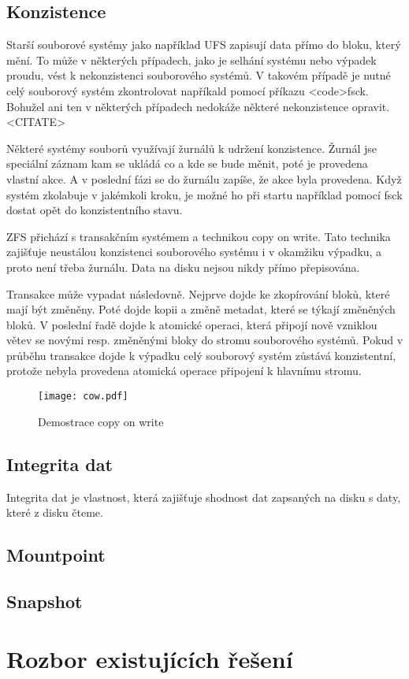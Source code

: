     \subsection{Konzistence}
    Starší souborové systémy jako například UFS zapisují data přímo do bloku, který mění. To může v některých případech, jako je selhání systému nebo výpadek proudu, vést k nekonzistenci souborového systémů. V takovém případě je nutné celý souborový systém zkontrolovat napříkald pomocí příkazu <code>fsck. Bohužel ani ten v některých případech
    nedokáže některé nekonzistence opravit. <CITATE>

    Některé systémy souborů využívají žurnálů k udržení konzistence. Žurnál jse speciální záznam kam se ukládá co a kde se bude měnit, poté
    je provedena vlastní akce. A v poslední fázi se do žurnálu zapíše, že akce byla provedena. Když systém zkolabuje v jakémkoli kroku, je možné ho při startu například pomocí
    fsck dostat opět do konzistentního stavu.

    ZFS přichází s transakčním systémem a technikou copy on write. Tato technika zajišťuje neustálou konzistenci souborového systému i v okamžiku výpadku, a proto není třeba žurnálu. Data na disku nejsou nikdy přímo přepisována.

    Transakce může vypadat následovně. Nejprve dojde ke zkopírování bloků, které mají být změněny. Poté dojde kopii a změně metadat, které se týkají změněných bloků. V poslední
    řadě dojde k atomické operaci, která připojí nově vzniklou větev se novými resp. změněnými bloky do stromu souborového systémů. Pokud v průběhu transakce dojde k výpadku
    celý souborový systém zůstává konzistentní, protože nebyla provedena atomická operace připojení k hlavnímu stromu.
    \begin{figure}[h]
        \caption{Demostrace copy on write}
        \label{cow}
        \texttt{[image: cow.pdf]}
    \end{figure}    
    \subsection{Integrita dat}
    \label{checksum}
    Integrita dat je vlastnost, která zajišťuje shodnost dat zapsaných na disku s daty, které z disku čteme.
    \subsection{Mountpoint}
    \label{mountpoint}
    \subsection{Snapshot}
    \label{snapshot}
\section{Rozbor existujících řešení}

